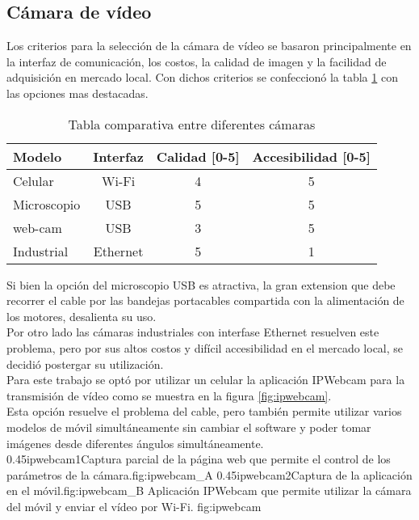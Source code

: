 \subsection{Cámara de vídeo}
   Los criterios para la selección de la cámara de vídeo se basaron principalmente en la interfaz de comunicación, los costos, la calidad de imagen y la facilidad de adquisición en mercado local. 
   Con dichos criterios se confeccionó la tabla \ref{tab:camara_selection} con las opciones mas destacadas.

   \begin{table}[h]
   \centering
   \caption[Seleccion de la cámara]{Tabla comparativa entre diferentes cámaras}
   \begin{tabular}{l c c c}
      \toprule
      \textbf{Modelo}    & \textbf{Interfaz}       & \textbf{Calidad [0-5]} & \textbf{Accesibilidad [0-5]}  \\
      \midrule
      Celular     & Wi-Fi    & 4& 5\\
      Microscopio & USB      & 5& 5\\
      web-cam     & USB      & 3& 5\\
      Industrial  & Ethernet & 5& 1\\
      \bottomrule
      \hline
   \end{tabular}
   \label{tab:camara_selection}
\end{table}

Si bien la opción del microscopio USB es atractiva, la gran extension que debe recorrer el cable por las bandejas portacables compartida con la alimentación de los motores, desalienta su uso. \\
   Por otro lado las cámaras industriales con interfase Ethernet resuelven este problema, pero por sus altos costos y difícil accesibilidad en el mercado local, se decidió postergar su utilización.\\
   Para este trabajo se optó por utilizar un celular la aplicación IPWebcam \citep{WEBSITE:ipwebcam} para la transmisión de vídeo como se muestra en la figura \ref{fig:ipwebcam}.\\
   Esta opción resuelve el problema del cable, pero también permite utilizar varios modelos de móvil simultáneamente sin cambiar el software y poder tomar imágenes desde diferentes ángulos simultáneamente. \\

\subfigab
         {0.45}{ipwebcam1}{Captura parcial de la página web que permite el control de los parámetros de la cámara.}{fig:ipwebcam_A}
         {0.45}{ipwebcam2}{Captura de la aplicación en el móvil.}{fig:ipwebcam_B}
         {Aplicación IPWebcam que permite utilizar la cámara del móvil y enviar el vídeo por Wi-Fi.}
         {fig:ipwebcam}

